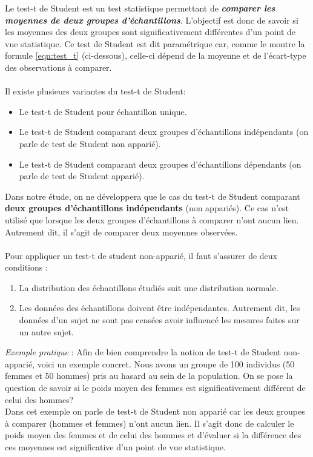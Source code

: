 \documentclass[10pt, oneside, a4paper]{article}
\begin{document}
Le test-t de Student est un test statistique permettant de \textbf{\textit{comparer les moyennes de deux groupes d’échantillons}}. L'objectif est donc de savoir si les moyennes des deux groupes sont significativement différentes d'un point de vue statistique. Ce test de Student est dit paramétrique car, comme le montre la formule \ref{eqn:test_t} (ci-dessous), celle-ci dépend de la moyenne et de l’écart-type des observations à comparer. \\ \\
Il existe plusieurs variantes du test-t de Student:
\begin{itemize}
\item Le test-t de Student pour échantillon unique.
\item Le test-t de Student comparant deux groupes d’échantillons indépendants (on parle de test de Student non apparié).
\item Le test-t de Student comparant deux groupes d’échantillons dépendants (on parle de test de Student apparié). \\
\end{itemize}
Dans notre étude, on ne développera que le cas du test-t de Student comparant \textbf{deux groupes d'échantillons indépendants} (non appariés). Ce cas n'est utilisé que lorsque les deux groupes d'échantillons à comparer n'ont aucun lien. Autrement dit, il s'agit de comparer deux moyennes observées. \\ \\
Pour appliquer un test-t de student non-apparié, il faut s'assurer de deux conditions : 
\begin{enumerate}
\item La distribution des échantillons étudiés suit une distribution normale.
\item  Les données des échantillons doivent être indépendantes. Autrement dit, les données d'un sujet ne sont pas censées avoir influencé les mesures faites sur un autre sujet. \\
\end{enumerate}
\textit{Exemple pratique} : Afin de bien comprendre la notion de test-t de Student non-apparié, voici un exemple concret.
Nous avons un groupe de 100 individus (50 femmes et 50 hommes) pris au hasard au sein de la population. On se pose la question de savoir si le poids moyen des femmes est significativement différent de celui des hommes? \\
Dans cet exemple on parle de test-t de Student non apparié car les deux groupes à comparer (hommes et femmes) n’ont aucun lien. Il s’agit donc de calculer le poids moyen des femmes et de celui des hommes et d’évaluer si la différence des ces moyennes est significative d'un point de vue statistique.
\end{document}
